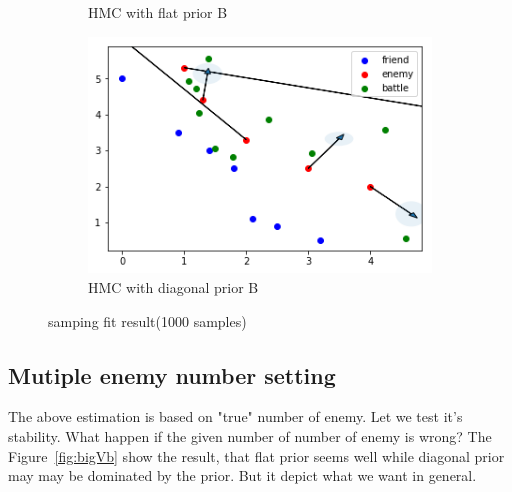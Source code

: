 \documentclass{article}
\begin{document}
\begin{figure}[h!]
\begin{subfigure}[b]{0.45\linewidth}
    \caption{HMC with flat prior B}
  \end{subfigure}
  \begin{subfigure}[b]{0.45\linewidth}
    \includegraphics[width=\linewidth]{Sampling42.png}
    \caption{HMC with diagonal prior B}
  \end{subfigure}
  \caption{samping fit result(1000 samples)}
  \label{fig:SamplingTen}
\end{figure}

\subsection{Mutiple enemy number setting}

The above estimation is based on "true" number of enemy. Let we test it's stability. 
What happen if the given number of number of enemy is wrong? The Figure~\ref{fig:bigVb} 
show the result, that flat prior seems well while diagonal prior may may be dominated by 
the prior. But it depict what we want in general.
\end{document}
